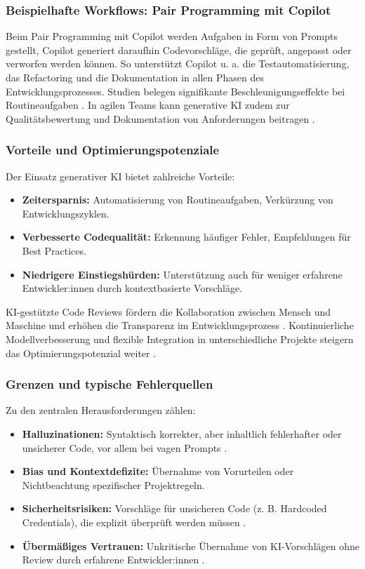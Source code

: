 \subsubsection{Beispielhafte Workflows: Pair Programming mit Copilot}

Beim Pair Programming mit Copilot werden Aufgaben in Form von Prompts gestellt,
Copilot generiert daraufhin Codevorschläge, die geprüft, angepasst oder
verworfen werden können. So unterstützt Copilot u. a. die Testautomatisierung,
das Refactoring und die Dokumentation in allen Phasen des
Entwicklungsprozesses. Studien belegen signifikante Beschleunigungseffekte bei
Routineaufgaben \cite{kerr_github_nodate, weisz_design_2024,
    shi_ai-assisted_2023}. In agilen Teams kann generative KI zudem zur
Qualitätsbewertung und Dokumentation von Anforderungen beitragen
\cite{geyer_case_2025}.

\subsubsection{Vorteile und Optimierungspotenziale}

Der Einsatz generativer KI bietet zahlreiche Vorteile:
\begin{itemize}
    \item \textbf{Zeitersparnis:} Automatisierung von Routineaufgaben, Verkürzung von Entwicklungszyklen.
    \item \textbf{Verbesserte Codequalität:} Erkennung häufiger Fehler, Empfehlungen für Best Practices.
    \item \textbf{Niedrigere Einstiegshürden:} Unterstützung auch für weniger erfahrene Entwickler:innen durch kontextbasierte Vorschläge.
\end{itemize}
KI-gestützte Code Reviews fördern die Kollaboration zwischen Mensch und Maschine und erhöhen die Transparenz im Entwicklungsprozess \cite{alami_human_2025}. Kontinuierliche Modellverbesserung und flexible Integration in unterschiedliche Projekte steigern das Optimierungspotenzial weiter \cite{kerr_github_nodate, weisz_design_2024}.

\subsubsection{Grenzen und typische Fehlerquellen}

Zu den zentralen Herausforderungen zählen:
\begin{itemize}
    \item \textbf{Halluzinationen:} Syntaktisch korrekter, aber inhaltlich fehlerhafter oder unsicherer Code, vor allem bei vagen Prompts \cite{shi_ai-assisted_2023}.
    \item \textbf{Bias und Kontextdefizite:} Übernahme von Vorurteilen oder Nichtbeachtung spezifischer Projektregeln.
    \item \textbf{Sicherheitsrisiken:} Vorschläge für unsicheren Code (z. B. Hardcoded Credentials), die explizit überprüft werden müssen \cite{shi_ai-assisted_2023}.
    \item \textbf{Übermäßiges Vertrauen:} Unkritische Übernahme von KI-Vorschlägen ohne Review durch erfahrene Entwickler:innen \cite{weisz_design_2024}.
\end{itemize}

